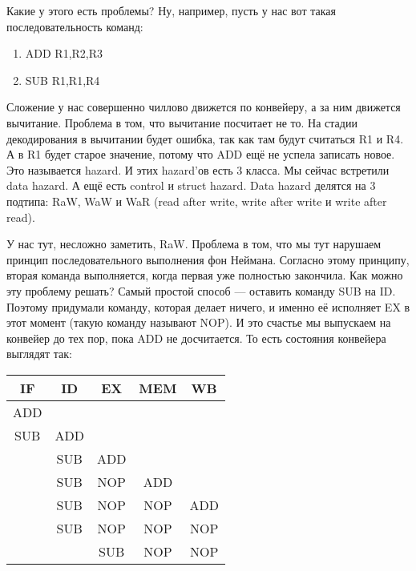 \documentclass{article}
\begin{document}
    Какие у этого есть проблемы? Ну, например, пусть у нас вот такая последовательность команд:
    \begin{enumerate}[1.]
        \item ADD R1,R2,R3
        \item SUB R1,R1,R4
    \end{enumerate}
    Сложение у нас совершенно чиллово движется по конвейеру, а за ним движется вычитание. Проблема в том, что вычитание посчитает не то. На стадии декодирования в вычитании будет ошибка, так как там будут считаться R1 и R4. А в R1 будет старое значение, потому что ADD ещё не успела записать новое. Это называется hazard. И этих hazard'ов есть 3 класса. Мы сейчас встретили data hazard. А ещё есть control и struct hazard. Data hazard делятся на 3 подтипа: RaW, WaW и WaR (read after write, write after write и write after read).
    \begin{center}
    \end{center}
    У нас тут, несложно заметить, RaW. Проблема в том, что мы тут нарушаем принцип последовательного выполнения фон Неймана. Согласно этому принципу, вторая команда выполняется, когда первая уже полностью закончила. Как можно эту проблему решать? Самый простой способ --- оставить команду SUB на ID. Поэтому придумали команду, которая делает ничего, и именно её исполняет EX в этот момент (такую команду называют NOP). И это счастье мы выпускаем на конвейер до тех пор, пока ADD не досчитается. То есть состояния конвейера выглядят так:
    \begin{center}
        \begin{tabular}{|c|c|c|c|c|}
            \hline
            IF & ID & EX & MEM & WB\\
            \hline
            ADD & & & & \\
            SUB & ADD & & & \\
            & SUB & ADD & & \\
            & SUB & NOP & ADD & \\
            & SUB & NOP & NOP & ADD\\
            & SUB & NOP & NOP & NOP\\
            & & SUB & NOP & NOP\\
            \hline
        \end{tabular}
    \end{center}
\end{document}
